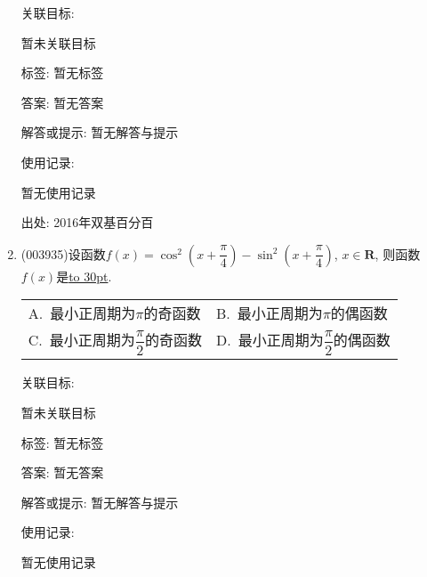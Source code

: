 \documentclass[10pt,a4paper]{article}
\newcommand{\blank}[1]{\underline{\hbox to #1pt{}}}
\newcommand{\twoch}[4]{\par\begin{tabular}{p{.46\textwidth}p{.46\textwidth}}
A.~#1& B.~#2\\
C.~#3& D.~#4
\end{tabular}}
\begin{document}
\begin{enumerate}[1.]
关联目标:

暂未关联目标



标签: 暂无标签

答案: 暂无答案

解答或提示: 暂无解答与提示

使用记录:

暂无使用记录


出处: 2016年双基百分百
\item { (003935)}设函数$f(x)=\cos^2\left(x+\dfrac{\pi}{4}\right)-\sin^2\left(x+\dfrac{\pi}{4}\right)$, $x\in \mathbf{R}$, 则函数$f(x)$是\blank{30}.
\twoch{最小正周期为$\pi$的奇函数}{最小正周期为$\pi$的偶函数}{最小正周期为$\dfrac{\pi}{2}$的奇函数}{最小正周期为$\dfrac{\pi}{2}$的偶函数}


关联目标:

暂未关联目标



标签: 暂无标签

答案: 暂无答案

解答或提示: 暂无解答与提示

使用记录:

暂无使用记录



\end{enumerate}
\end{document}
